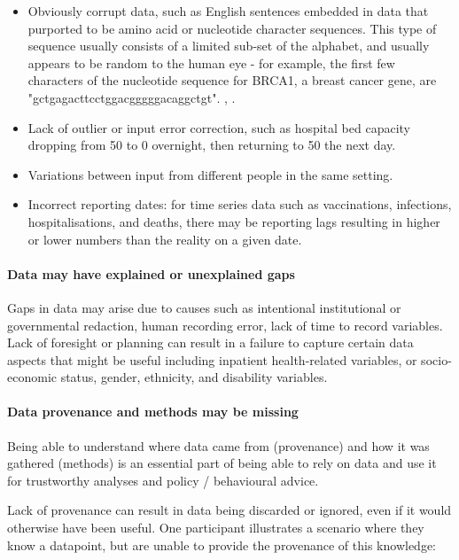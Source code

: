 \documentclass{CUP-JNL-DAP}%
\begin{document}
\begin{itemize}
\item Obviously corrupt data, such as English sentences embedded in data that purported to be amino acid or nucleotide character sequences. This type of sequence usually consists of a limited sub-set of the alphabet, and usually appears to be random to the human eye - for example, the first few characters of the nucleotide sequence for BRCA1, a breast cancer gene, are "gctgagacttcctggacgggggacaggctgt". \cite{intermine_authors_brca1_2022}, \cite{smith_intermine_2012}.
\item Lack of outlier or input error correction, such as hospital bed capacity dropping from 50 to 0 overnight, then returning to 50 the next day. 
\item Variations between input from different people in the same setting. 
\item Incorrect reporting dates: for time series data such as vaccinations, infections, hospitalisations, and deaths, there may be reporting lags resulting in higher or lower numbers than the reality on a given date.
\end{itemize}

\paragraph{Data may have explained or unexplained gaps}

Gaps in data may arise due to causes such as intentional institutional or governmental redaction, human recording error, lack of time to record variables. Lack of foresight or planning can result in a failure to capture certain data aspects that might be useful including inpatient health-related variables, or socio-economic status, gender, ethnicity, and disability variables. 

\paragraph{Data provenance and methods may be missing}
Being able to understand where data came from (provenance) and how it was gathered (methods) is an essential part of being able to rely on data and use it for trustworthy analyses and policy / behavioural advice. 

Lack of provenance can result in data being discarded or ignored, even if it would otherwise have been useful. One participant illustrates a scenario where they know a datapoint, but are unable to provide the provenance of this knowledge:
\end{document}

